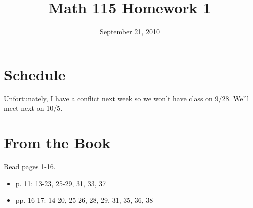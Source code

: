 \documentclass[fleqn,addpoints]{exam}
\title{Math 115 Homework 1}
\date{September 21, 2010}
\begin{document}
\maketitle

\section{Schedule}

Unfortunately, I have a conflict next week so we won't have class on 9/28.  We'll meet next on 10/5.

\section{From the Book}

Read pages 1-16.
 
\begin{itemize}
  \item p. 11: 13-23, 25-29, 31, 33, 37
  \item pp. 16-17: 14-20, 25-26, 28, 29, 31, 35, 36, 38
\end{itemize}

\ifprintanswers
\end{document}
